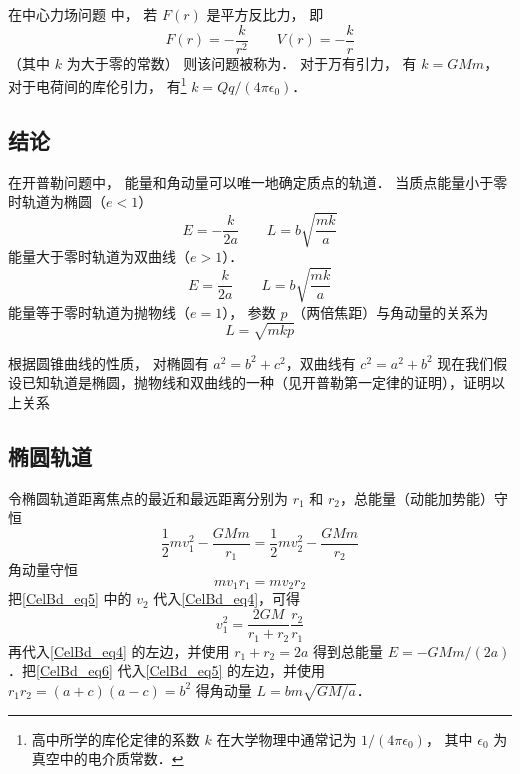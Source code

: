 

在中心力场问题 中， 若 $F(r)$ 是平方反比力， 即
\begin{equation}
F(r) = -\frac{k}{r^2}  \qquad V(r) = -\frac{k}{r}
\end{equation}
（其中 $k$ 为大于零的常数） 则该问题被称为． 对于万有引力， 有 $k = GMm$， 对于电荷间的库伦引力， 有\footnote{高中所学的库伦定律的系数 $k$ 在大学物理中通常记为 $1/(4\pi\epsilon_0)$， 其中 $\epsilon_0$ 为真空中的电介质常数．} $k = Qq/(4\pi\epsilon_0)$．

\subsection{结论}
在开普勒问题中， 能量和角动量可以唯一地确定质点的轨道． 当质点能量小于零时轨道为椭圆（$e<1$）
\begin{equation}
E=-\frac{k}{2a} \qquad  L = b \sqrt{\frac{mk}{a}}
\end{equation}
能量大于零时轨道为双曲线（$e>1$）．
\begin{equation}
E=\frac{k}{2a}  \qquad  L = b \sqrt{\frac{mk}{a}}
\end{equation}
能量等于零时轨道为抛物线（$e=1$）， 参数 $p$ （两倍焦距）与角动量的关系为
\begin{equation}
L = \sqrt{mkp}
\end{equation}

根据圆锥曲线的性质， 对椭圆有 $a^2=b^2+c^2$，双曲线有 $c^2=a^2+b^2$
现在我们假设已知轨道是椭圆，抛物线和双曲线的一种（见开普勒第一定律的证明），证明以上关系

\subsection{椭圆轨道}
令椭圆轨道距离焦点的最近和最远距离分别为 $r_1$ 和 $r_2$，总能量（动能加势能）守恒
\begin{equation}\label{CelBd_eq4}
\frac12 m v_1^2 - \frac{GMm}{r_1} = \frac12 mv_2^2 - \frac{GMm}{r_2}
\end{equation}
角动量守恒
\begin{equation}\label{CelBd_eq5}
mv_1 r_1 = mv_2 r_2
\end{equation}
把\autoref{CelBd_eq5} 中的 $v_2$ 代入\autoref{CelBd_eq4}，可得
\begin{equation}\label{CelBd_eq6}
v_1^2 = \frac{2GM}{r_1 + r_2} \frac{r_2}{r_1}
\end{equation}
再代入\autoref{CelBd_eq4} 的左边，并使用 $r_1+r_2=2a$ %
得到总能量 $E=-GMm/(2a)$．把\autoref{CelBd_eq6} 代入\autoref{CelBd_eq5} 的左边，并使用 $r_1 r_2 = (a+c)(a-c) =b^2$ %
得角动量 $L = bm \sqrt{GM/a}$．

